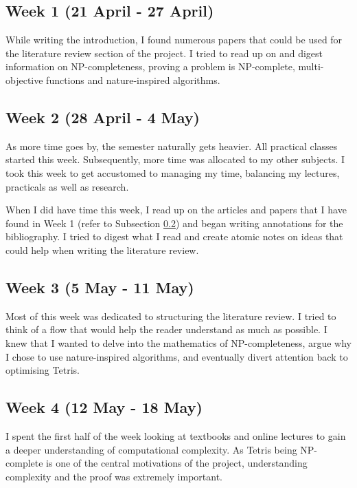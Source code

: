 \documentclass[a4paper, 12pt]{extreport}
\begin{document}
			\subsection{Week 1 (21 April - 27 April)}
				
				While writing the introduction, I found numerous papers that could be used for the literature review section of the project. I tried to read up on and digest information on NP-completeness, proving a problem is NP-complete, multi-objective functions and nature-inspired algorithms.
				
			\subsection{Week 2 (28 April - 4 May)}\label{subsec:litrevw2}
				
				As more time goes by, the semester naturally gets heavier. All practical classes started this week. Subsequently, more time was allocated to my other subjects. I took this week to get accustomed to managing my time, balancing my lectures, practicals as well as research.
				
				When I did have time this week, I read up on the articles and papers that I have found in Week 1 (refer to Subsection \ref{subsec:litrevw2}) and began writing annotations for the bibliography. I tried to digest what I read and create atomic notes on ideas that could help when writing the literature review.
				
			\subsection{Week 3 (5 May - 11 May)}\label{subsec:litrevw3}
			
				Most of this week was dedicated to structuring the literature review. I tried to think of a flow that would help the reader understand as much as possible. I knew that I wanted to delve into the mathematics of NP-completeness, argue why I chose to use nature-inspired algorithms, and eventually divert attention back to optimising Tetris.
				
			\subsection{Week 4 (12 May - 18 May)}
				
				I spent the first half of the week looking at textbooks and online lectures to gain a deeper understanding of computational complexity. As Tetris being NP-complete is one of the central motivations of the project, understanding complexity and the proof was extremely important.
				
\end{document}
